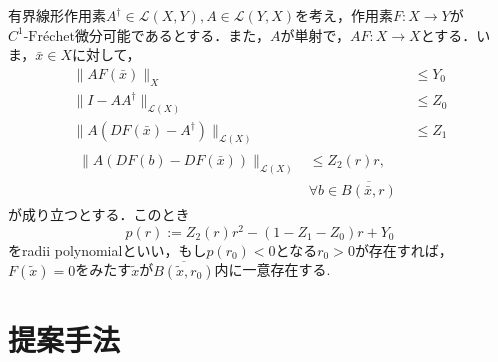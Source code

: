 \documentclass[a4paper,10pt,twocolumn]{jsarticle}
\newcommand{\fre}{Fr\'{e}chet}
\begin{document}
\begin{Thm}
  \label{thm:radii}
  有界線形作用素$A^\dagger \in \mathcal{L}(X, Y), A \in \mathcal{L}(Y, X)$を考え，作用素$F:X \rightarrow Y$が$C^1\text{-\fre{}}$微分可能であるとする．また，$A$が単射で，$AF:X \rightarrow X$とする．いま，$\bar{x} \in X$に対して，
  \begin{align}
      \|AF(\bar{x})\|_X                             & \leq Y_0                                             \\
      \|I-AA^\dagger\|_{\mathcal{L}(X)}              & \leq Z_0                                             \\
      \|A(DF(\bar{x})-A^\dagger)\|_{\mathcal{L}(X)} & \leq Z_1                                             \\
      \begin{split}
        \|A(DF(b)-DF(\bar{x}))\|_{\mathcal{L}(X)} &\leq Z_2(r)r, \\ & \forall b \in \overline{B(\bar{x},r)}
      \end{split}
  \end{align}
  が成り立つとする．このとき
  \begin{equation}
    p(r) := Z_2(r)r^2 - (1-Z_1-Z_0)r+Y_0
  \end{equation}
  をradii polynomialといい，もし$p(r_0)<0$となる$r_0>0$が存在すれば，$F(\tilde{x})=0$をみたす$\tilde{x}$が$\overline{B(\tilde{x},r_0)}$内に一意存在する.
\end{Thm}

\vspace{-1mm}
\section{提案手法}
\vspace{-1mm}
\end{document}
